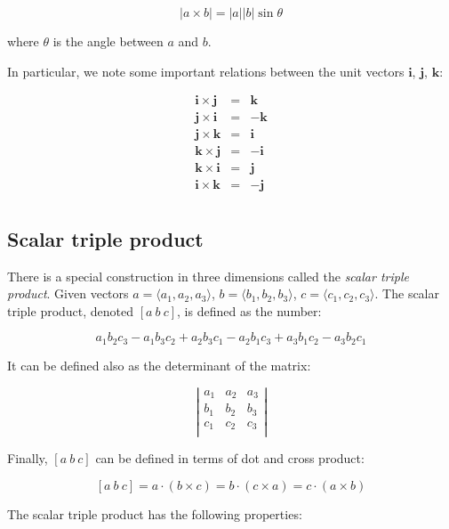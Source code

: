 \documentclass[10pt]{amsart}
\begin{document}
$$|a \times b| = |a||b| \sin \theta$$

where $\theta$ is the angle between $a$ and $b$.

In particular, we note some important relations between the unit
vectors $\mathbf{i}$, $\mathbf{j}$, $\mathbf{k}$:

\begin{eqnarray*}
  \mathbf{i} \times \mathbf{j} & = & \mathbf{k} \\
  \mathbf{j} \times \mathbf{i} & = & -\mathbf{k}\\
  \mathbf{j} \times \mathbf{k} & = & \mathbf{i} \\
  \mathbf{k} \times \mathbf{j} & = & -\mathbf{i} \\
  \mathbf{k} \times \mathbf{i} & = & \mathbf{j} \\
  \mathbf{i} \times \mathbf{k} & = & -\mathbf{j} \\
\end{eqnarray*}

\subsection{Scalar triple product}

There is a special construction in three dimensions called the {\em
scalar triple product}. Given vectors $a = \langle a_1, a_2, a_3
\rangle$, $b = \langle b_1, b_2, b_3 \rangle$, $c = \langle c_1, c_2,
c_3 \rangle$. The scalar triple product, denoted $[a \ b \ c]$, is
defined as the number:

$$a_1b_2c_3 - a_1b_3c_2 + a_2b_3c_1 - a_2b_1c_3 + a_3b_1c_2 - a_3b_2c_1$$

It can be defined also as the determinant of the matrix:

$$\left|\begin{array}{lll} a_1 & a_2 & a_3 \\ b_1 & b_2 & b_3 \\ c_1 & c_2 & c_3 \\\end{array}\right|$$

Finally, $[a \ b \ c]$ can be defined in terms of dot and cross product:

$$[a \ b \ c] = a \cdot (b \times c) = b \cdot (c \times a) = c \cdot (a \times b)$$

The scalar triple product has the following properties:
\end{document}
